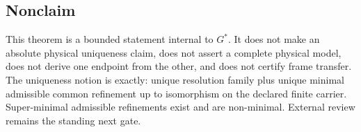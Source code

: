\subsection*{Nonclaim}

This theorem is a bounded statement internal to \(G^\ast\).  It does not make
an absolute physical uniqueness claim, does not assert a complete physical
model, does not derive one endpoint from the other, and does not certify frame
transfer.  The uniqueness notion is exactly: unique resolution family plus
unique minimal admissible common refinement up to isomorphism on the declared
finite carrier.  Super-minimal admissible refinements exist and are
non-minimal.  External review remains the standing next gate.
